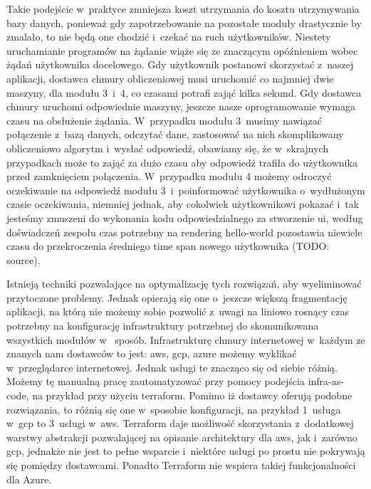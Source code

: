 Takie podejście w~praktyce zmniejsza koszt utrzymania do kosztu utrzymywania bazy danych, ponieważ gdy zapotrzebowanie na pozostałe moduły drastycznie by zmalało, to nie będą one chodzić i~czekać na ruch użytkowników.
Niestety uruchamianie programów na żądanie wiąże się ze znaczącym opóźnieniem wobec żądań użytkownika docelowego.
Gdy użytkownik postanowi skorzystać z~naszej aplikacji, dostawca chmury obliczeniowej musi uruchomić co najmniej dwie maszyny, dla modułu 3~i~4, co czasami potrafi zająć kilka sekund.
Gdy dostawca chmury uruchomi odpowiednie maszyny, jeszcze nasze oprogramowanie wymaga czasu na obsłużenie żądania.
W~przypadku modułu 3~musimy nawiązać połączenie z~bazą danych, odczytać dane, zastosować na nich skomplikowany obliczeniowo algorytm i~wysłać odpowiedź, obawiamy się, że w~skrajnych przypadkach może to zająć za dużo czasu aby odpowiedź trafiła do użytkownika przed zamknięciem połączenia.
W~przypadku modułu 4 możemy odroczyć oczekiwanie na odpowiedź modułu 3~i~poinformować użytkownika o~wydłużonym czasie oczekiwania, niemniej jednak, aby cokolwiek użytkownikowi pokazać i~tak jesteśmy zmuszeni do wykonania kodu odpowiedzialnego za stworzenie \gls{ui}, według doświadczeń zespołu czas potrzebny na \gls{rendering} \gls{hello-world} pozostawia niewiele czasu do przekroczenia średniego time span nowego użytkownika (TODO: source).

Istnieją techniki pozwalające na optymalizację tych rozwiązań, aby wyeliminować przytoczone problemy.
Jednak opierają się one o~jeszcze większą fragmentację aplikacji, na którą nie możemy sobie pozwolić z~uwagi na liniowo rosnący czas potrzebny na konfigurację infrastruktury potrzebnej do skomunikowana wszystkich modułów w~ sposób.
Infrastrukturę chmury internetowej w~każdym ze znanych nam dostawców to jest: \acrshort{aws}, \acrshort{gcp}, \acrshort{azure} możemy wyklikać w~przeglądarce internetowej.
Jednak usługi te znacząco się od siebie różnią.
Możemy tę manualną pracę zautomatyzować przy pomocy podejścia \gls{infra-as-code}, na przykład przy użyciu terraform.
Pomimo iż dostawcy oferują podobne rozwiązania, to różnią się one w~sposobie konfiguracji, na przykład 1~usługa w~\acrshort{gcp} to 3~usługi w~\acrshort{aws}\@.
Terraform daje możliwość skorzystania z~dodatkowej warstwy abstrakcji pozwalającej na opisanie architektury dla \acrshort{aws}, jak i~zarówno \acrshort{gcp}, jednakże nie jest to pełne wsparcie i~niektóre usługi po prostu nie pokrywają się pomiędzy dostawcami.
Ponadto Terraform nie wspiera takiej funkcjonalności dla Azure.

